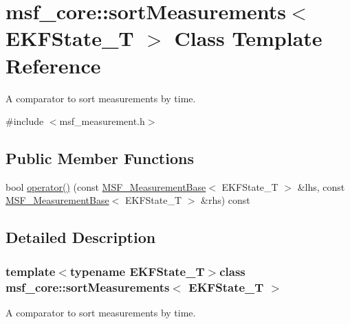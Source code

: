 \hypertarget{classmsf__core_1_1sortMeasurements}{\section{msf\-\_\-core\-:\-:sort\-Measurements$<$ E\-K\-F\-State\-\_\-\-T $>$ Class Template Reference}
\label{classmsf__core_1_1sortMeasurements}
}


A comparator to sort measurements by time.  




{\ttfamily \#include $<$msf\-\_\-measurement.\-h$>$}

\subsection*{Public Member Functions}
\begin{DoxyCompactItemize}
\item 
bool \hyperlink{classmsf__core_1_1sortMeasurements_ad554b9b3b5a9c7bc462a34a5b9662a1a}{operator()} (const \hyperlink{classmsf__core_1_1MSF__MeasurementBase}{M\-S\-F\-\_\-\-Measurement\-Base}$<$ E\-K\-F\-State\-\_\-\-T $>$ \&lhs, const \hyperlink{classmsf__core_1_1MSF__MeasurementBase}{M\-S\-F\-\_\-\-Measurement\-Base}$<$ E\-K\-F\-State\-\_\-\-T $>$ \&rhs) const 
\end{DoxyCompactItemize}


\subsection{Detailed Description}
\subsubsection*{template$<$typename E\-K\-F\-State\-\_\-\-T$>$class msf\-\_\-core\-::sort\-Measurements$<$ E\-K\-F\-State\-\_\-\-T $>$}

A comparator to sort measurements by time. 

